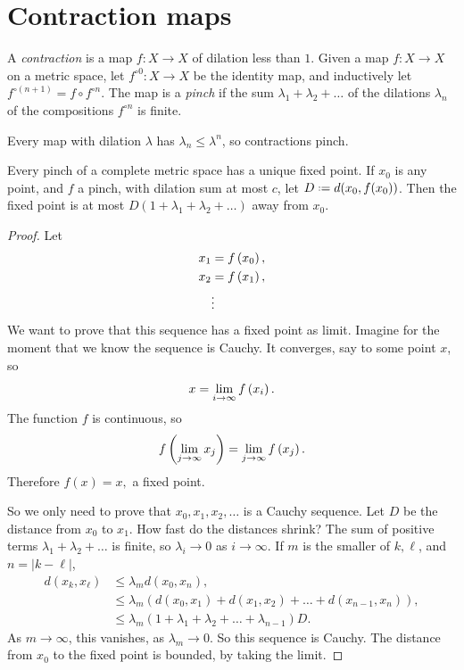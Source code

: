 \section{Contraction maps}
A \emph{contraction} is a map \(f \colon X \to X\) of dilation less than \(1\).
Given a map \(f \colon X \to X\) on a metric space, let \(f^{\circ 0} \colon X \to X\) be the identity map, and inductively let \(f^{\circ (n+1)}=f \circ f^{\circ n}\).
The map is a \emph{pinch} if the sum \(\lambda_1+\lambda_2+\dots\) of the dilations \(\lambda_n\) of the  compositions \(f^{\circ n}\) is finite.
\begin{example}
Every map with dilation \(\lambda\) has \(\lambda_n \le \lambda^n\), so contractions pinch.
\end{example}
\begin{theorem}
Every pinch of a complete metric space has a unique fixed point.
If \(x_0\) is any point, and \(f\) a pinch, with dilation sum at most \(c\), let \(D\defeq d(x_0,f(x_0))\).
Then the fixed point is at most \(D(1+\lambda_1+\lambda_2+\dots)\) away from \(x_0\).
\end{theorem}
\begin{proof}
Let
\begin{align*}
x_1 &= f\left(x_0\right), \\
x_2 &= f\left(x_1\right), \\
&\vdots
\end{align*}
We want to prove that this sequence has a fixed point as limit. 
Imagine for the moment that we know the sequence is Cauchy. 
It converges, say to some point \(x\), so 
\[
x=\lim_{i \to \infty} f\left(x_i\right).
\]
The function \(f\) is continuous, so
\[
f\left(\lim_{j \to \infty} x_j\right)
=
\lim_{j \to \infty} f\left(x_j\right).
\]
Therefore
\(
f(x)=x,
\)
a fixed point.

So we only need to prove that \(x_0,x_1, x_2, \dots\) is a Cauchy sequence. 
Let \(D\) be the distance  from \(x_0\) to \(x_1\). 
How fast do the distances shrink?
The sum of positive terms \(\lambda_1+\lambda_2+\dots\) is finite, so \(\lambda_i \to 0\) as \(i\to\infty\).
If \(m\) is the smaller of \(k,\ell\), and \(n=|k-\ell|\),
\begin{align*}
d(x_k,x_{\ell})
&\le
\lambda_m d(x_0,x_n),
\\
&\le
\lambda_m (d(x_0,x_1)+d(x_1,x_2)+\dots+d(x_{n-1},x_n)),
\\
&
\le
\lambda_m(1+\lambda_1+\lambda_2+\dots+\lambda_{n-1})D.
\end{align*}
As \(m\to \infty\), this vanishes, as \(\lambda_m\to 0\).
So this sequence is Cauchy.
The distance from \(x_0\) to the fixed point is bounded, by taking the limit.
\end{proof}
